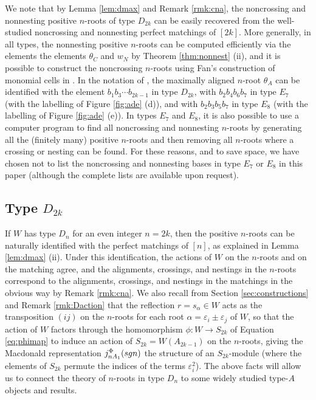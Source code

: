 \documentclass[11pt]{amsart}
\theoremstyle{plain}
\theoremstyle{definition}
\theoremstyle{remark}
\numberwithin{equation}{subsection}
\newcommand{\al}{\alpha}
\newcommand{\ep}{\varepsilon}
\newcommand{\ra}{\rightarrow}
\newcommand{\macd}[2]{j^{#1}_{#2}({\rm{sgn}})}
\begin{document}
We note that by Lemma \ref{lem:dmax} and Remark \ref{rmk:cna}, the noncrossing
and nonnesting positive $n$-roots of type $D_{2k}$ can be easily recovered from
the well-studied noncrossing and nonnesting perfect matchings of $[2k]$. More
generally, in all types, the nonnesting positive $n$-roots can be computed
efficiently via the elements the elements $\theta_C$ and $w_N$ by Theorem
\ref{thm:nonnest} (ii), and it is possible to construct the noncrossing
$n$-roots using Fan's construction of monomial cells in \cite{fan97}.  In the
notation of \cite{fan97}, the maximally aligned $n$-root $\theta_A$ can be
identified with the element $b_1 b_3 \cdots b_{2k-1}$ in type $D_{2k}$, with
$b_2 b_4 b_6 b_7$ in type $E_7$ (with the labelling of Figure \ref{fig:ade}
(d)), and with $b_2 b_3 b_5 b_7$ in type $E_8$ (with the labelling of Figure
\ref{fig:ade} (e)). In types $E_7$ and $E_8$, it is also possible to use a
computer program to find all noncrossing and nonnesting $n$-roots by generating
all the (finitely many) positive $n$-roots and then removing all $n$-roots where
a crossing or nesting can be found.  For these reasons, and to save space, we
have chosen not to list the noncrossing and nonnesting bases in type $E_7$ or
$E_8$ in this paper (although the complete lists are available upon request).


\subsection{Type \texorpdfstring{$D_{2k}$}{D}}
\label{sec:D}
If $W$ has type $D_n$ for an even integer $n=2k$, then the positive $n$-roots
can be naturally identified with the perfect matchings of $[n]$, as explained in
Lemma \ref{lem:dmax} (ii). Under this identification, the actions of $W$ on the
$n$-roots and on the matching agree, and the alignments, crossings, and nestings
in the $n$-roots correspond to the alignments, crossings, and nestings in the
matchings in the obvious way by Remark \ref{rmk:cna}.  We also recall from
Section \ref{sec:constructions} and Remark \ref{rmk:Daction} that the reflection
$r=s_\al\in W$ acts as the transposition $(ij)$ on the $n$-roots for each root
$\al=\ep_i\pm\ep_j$ of $W$, so that the action of $W$ factors through the
homomorphism $\phi: W\ra S_{2k}$ of Equation \eqref{eq:phimap} to induce an
action of $S_{2k}=W(A_{2k-1})$ on the $n$-roots, giving the Macdonald
representation $\macd{\Phi}{nA_1}$ the structure of an $S_{2k}$-module (where
the elements of $S_{2k}$ permute the indices of the terms $\ep_i^2$).  The above
facts will allow us to connect the theory of $n$-roots in type $D_n$ to some
widely studied type-$A$ objects and results.
\end{document}

